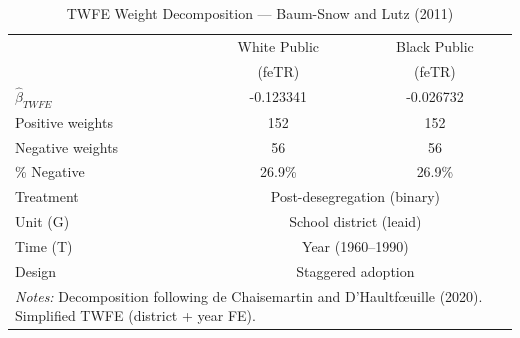 \begin{table}[htbp]
\centering
\caption{TWFE Weight Decomposition --- Baum-Snow and Lutz (2011)}
\label{tab:baumsnow_twowayfe}
\begin{tabular}{lcc}
\toprule
 & White Public & Black Public \\
 & (feTR) & (feTR) \\
\midrule
$\hat{\beta}_{TWFE}$ & -0.123341 & -0.026732 \\
Positive weights & 152 & 152 \\
Negative weights & 56 & 56 \\
\% Negative & 26.9\% & 26.9\% \\
\addlinespace
Treatment & \multicolumn{2}{c}{Post-desegregation (binary)} \\
Unit (G) & \multicolumn{2}{c}{School district (leaid)} \\
Time (T) & \multicolumn{2}{c}{Year (1960--1990)} \\
Design & \multicolumn{2}{c}{Staggered adoption} \\
\bottomrule
\multicolumn{3}{p{0.85\linewidth}}{\footnotesize
 \textit{Notes:} Decomposition following de Chaisemartin and
 D'Haultf\oe uille (2020). Simplified TWFE (district + year FE).}
\end{tabular}
\end{table}
